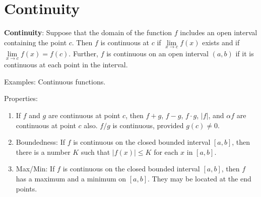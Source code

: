 \documentclass[]{book}
\providecommand{\tightlist}{%
  \setlength{\itemsep}{0pt}\setlength{\parskip}{0pt}}
\theoremstyle{definition}
\theoremstyle{definition}
\theoremstyle{definition}
\theoremstyle{remark}
\begin{document}
\begin{comment}
\parbox[t]{2in}{Example:  $\lim\limits_{x\to \infty} 1/x = \lim\limits_{x\to -\infty} 1/x= 0$}\parbox[t]{1in}{\,  {\texttt{[image: 1ovrx.eps]}}}\\ 
\end{comment}

\section{Continuity}\label{continuity}

\textbf{Continuity}: Suppose that the domain of the function \(f\)
includes an open interval containing the point \(c\). Then \(f\) is
continuous at \(c\) if \(\lim\limits_{x \to c} f(x)\) exists and if
\(\lim\limits_{x \to c} f(x)=f(c)\). Further, \(f\) is continuous on an
open interval \((a,b)\) if it is continuous at each point in the
interval.

Examples: Continuous functions.

\begin{comment}
    \parbox[t]{1.5in}{\hfill$f(x)=\sqrt{x}\quad$}\parbox[t]{1in}{\,  {\texttt{[image: sqrt.eps]}}}
    \parbox[t]{1.5in}{\hfill$f(x)=e^x\quad$}\parbox[t]{1in}{\,  {\texttt{[image: exp.eps]}}}
    \item[] Examples: Discontinuous functions.\\
    \parbox[t]{1.5in}{\hfill$f(x)=\mbox{floor}(x)\quad$}\parbox[t]{1in}{\,  {\texttt{[image: floor.eps]}}}
    \parbox[t]{1.5in}{\hfill$f(x)=1+\frac{1}{x^2}\quad$}\parbox[t]{1in}{\,  {\texttt{[image: 1p1ovrx2.eps]}}}
\end{comment}

Properties:

\begin{enumerate}
\def\labelenumi{\arabic{enumi}.}
\tightlist
\item
  If \(f\) and \(g\) are continuous at point \(c\), then \(f+g\),
  \(f-g\), \(f \cdot g\), \(|f|\), and \(\alpha f\) are continuous at
  point \(c\) also. \(f/g\) is continuous, provided \(g(c)\ne 0\).
\item
  Boundedness: If \(f\) is continuous on the closed bounded interval
  \([a,b]\), then there is a number \(K\) such that \(|f(x)|\le K\) for
  each \(x\) in \([a,b]\).
\item
  Max/Min: If \(f\) is continuous on the closed bounded interval
  \([a,b]\), then \(f\) has a maximum and a minimum on \([a,b]\). They
  may be located at the end points.
\end{enumerate}
\end{document}
